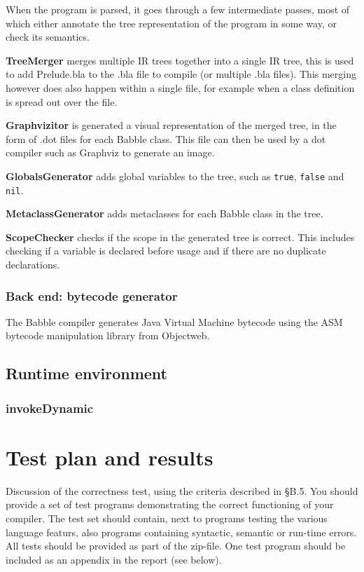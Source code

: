 \documentclass[a4paper]{article}
\begin{document}
When the program is parsed, it goes through a few intermediate passes, most of which either annotate the tree representation of the program in some way, or check its semantics.

\textbf{TreeMerger} merges multiple IR trees together into a single IR tree, this is used to add Prelude.bla to the .bla file to compile (or multiple .bla files). This merging however does also happen within a single file, for example when a class definition is spread out over the file.

\textbf{Graphvizitor} is generated a visual representation of the merged tree, in the form of .dot files for each Babble class. This file can then be used by a dot compiler such as Graphviz to generate an image.

\textbf{GlobalsGenerator} adds global variables to the tree, such as \texttt{true}, \texttt{false} and \texttt{nil}.

\textbf{MetaclassGenerator} adds metaclasses for each Babble class in the tree.

\textbf{ScopeChecker} checks if the scope in the generated tree is correct. This includes checking if a variable is declared before usage and if there are no duplicate declarations.

\subsubsection{Back end: bytecode generator}

The Babble compiler generates Java Virtual Machine bytecode using the ASM bytecode manipulation library from Objectweb.

\subsection{Runtime environment}

\subsubsection{invokeDynamic}

\section{Test plan and results}
Discussion of the correctness test, using the criteria described in §B.5. You
should provide a set of test programs demonstrating the correct functioning of your compiler. The test
set should contain, next to programs testing the various language featurs, also programs containing
syntactic, semantic or run-time errors.
All tests should be provided as part of the zip-file. One test program should be included as an appendix
in the report (see below).
\end{document}

